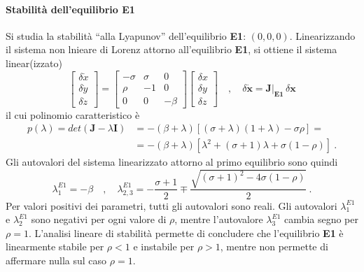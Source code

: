 \paragraph{Stabilità dell'equilibrio E1}
Si studia la stabilità ``alla Lyapunov'' dell'equilibrio \textbf{E1}: $(0,0,0)$. Linearizzando
 il sistema non lnieare di Lorenz attorno all'equilibrio \textbf{E1}, si ottiene il sistema
 linear(izzato)
\begin{equation}
 \begin{bmatrix} \delta \dot{x} \\ \delta \dot{y} \\ \delta \dot{z} \end{bmatrix} = 
 \begin{bmatrix}-\sigma & \sigma & 0 \\ \rho & -1 & 0 \\ 0 & 0 & - \beta \end{bmatrix}  
 \begin{bmatrix} \delta x \\ \delta y \\ \delta z \end{bmatrix} \quad , \quad
 \delta \dot{\bm{x}} = \bm{J}|_{\bm{E1}} \, \delta \bm{x}
\end{equation}
il cui polinomio caratteristico è
\begin{equation}
\begin{aligned}
 p(\lambda) = det(\bm{J}- \lambda \bm{I}) & = -(\beta+\lambda)[(\sigma+\lambda)(1+\lambda)-\sigma\rho] = \\ 
  & = -(\beta+\lambda) [ \lambda^2 + (\sigma+1)\lambda + \sigma(1-\rho)] \ . 
\end{aligned}
\end{equation}
Gli autovalori del sistema linearizzato attorno al primo equilibrio sono quindi
\begin{equation}
  \lambda^{E1}_1 = - \beta \quad , \quad  
  \lambda^{E1}_{2,3} = - \dfrac{\sigma+1}{2} \mp \dfrac{\sqrt{(\sigma+1)^2-4\sigma(1-\rho)}}{2} \ . 
\end{equation}
Per valori positivi dei parametri, tutti gli autovalori sono reali. Gli autovalori $\lambda^{E1}_1$
 e $\lambda^{E1}_2$ sono negativi per ogni valore di $\rho$, mentre l'autovalore $\lambda^{E1}_3$
 cambia segno per $\rho = 1$. L'analisi lineare di stabilità permette di concludere che l'equilibrio
 \textbf{E1} è linearmente stabile per $\rho<1$ e instabile per $\rho > 1$, mentre non
 permette di affermare nulla sul caso $\rho = 1$.

